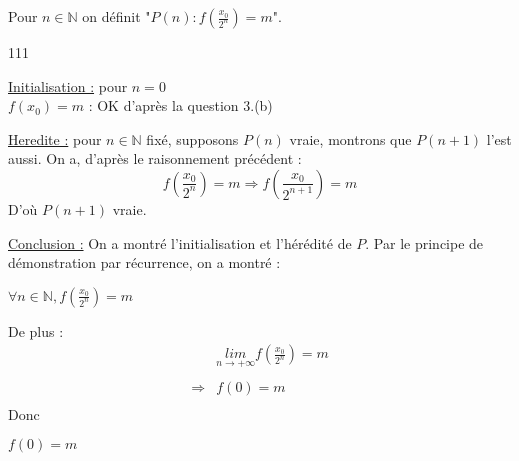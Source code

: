 Pour $n \in \mathbb{N}$ on définit "$P(n) : f\left(\frac{x_0}{2^n}\right)=m$".
\begin{dinglist}{111}
  \item \ul{Initialisation :} pour $n=0$\\
  $f(x_0)=m$ : OK d'après la question 3.(b)
  \item \ul{Heredite :}
  pour $n\in\mathbb{N}$ fixé, supposons $P(n)$ vraie, montrons que $P(n+1)$ l'est aussi.
  On a, d'après le raisonnement précédent :
  \[
    f\left(\frac{x_0}{2^n}\right)=m \Rightarrow f\left(\frac{x_0}{2^{n+1}}\right)=m
  \]
  D'où $P(n+1)$ vraie.
  \item \ul{Conclusion :}
  On a montré l'initialisation et l'hérédité de $P$. Par le principe de démonstration par récurrence, on a montré :
  \begin{result}
    $\forall n \in\mathbb{N}, f\left(\frac{x_0}{2^{n}}\right) = m$
  \end{result}
\end{dinglist}

De plus :
\[
  \begin{array}{rl}
                & \underset{n\rightarrow+\infty}{lim} f\left(\frac{x_0}{2^{n}}\right) = m \\\\
    \Rightarrow & f\left(0\right) = m                                                     \\
  \end{array}
\]
Donc
\begin{result}
  $f\left(0\right) = m  $
\end{result}
